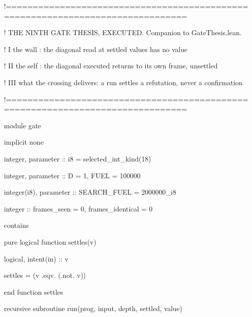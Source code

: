 \documentclass[10pt,twocolumn]{article}
\newenvironment{Shaded}{}{}
\newcommand{\CommentTok}[1]{#1}
\newcommand{\DataTypeTok}[1]{#1}
\newcommand{\DecValTok}[1]{#1}
\newcommand{\FunctionTok}[1]{#1}
\newcommand{\KeywordTok}[1]{#1}
\newcommand{\NormalTok}[1]{#1}
\newcommand{\OperatorTok}[1]{#1}
\providecommand{\CommentTok}[1]{#1}
\providecommand{\DataTypeTok}[1]{#1}
\providecommand{\DecValTok}[1]{#1}
\providecommand{\FunctionTok}[1]{#1}
\providecommand{\KeywordTok}[1]{#1}
\providecommand{\NormalTok}[1]{#1}
\providecommand{\OperatorTok}[1]{#1}
\providecommand{\CommentTok}[1]{#1}
\providecommand{\DataTypeTok}[1]{#1}
\providecommand{\DecValTok}[1]{#1}
\providecommand{\FunctionTok}[1]{#1}
\providecommand{\KeywordTok}[1]{#1}
\providecommand{\NormalTok}[1]{#1}
\providecommand{\OperatorTok}[1]{#1}
\begin{document}
\begin{strip}
\begin{Shaded}
\begin{Highlighting}[]
\CommentTok{!===============================================================================}

\CommentTok{!  THE NINTH GATE THESIS, EXECUTED. Companion to GateThesis.lean.}

\CommentTok{!  I   the wall   : the diagonal read at settled values has no value}

\CommentTok{!  II  the self   : the diagonal executed returns to its own frame, unsettled}

\CommentTok{!  III what the crossing delivers: a run settles a refutation, never a confirmation}

\CommentTok{!===============================================================================}

\KeywordTok{module}\NormalTok{ gate}

  \KeywordTok{implicit} \KeywordTok{none}

  \DataTypeTok{integer}\NormalTok{, }\DataTypeTok{parameter} \DataTypeTok{::}\NormalTok{ i8 }\KeywordTok{=} \FunctionTok{selected\_int\_kind}\NormalTok{(}\DecValTok{18}\NormalTok{)}

  \DataTypeTok{integer}\NormalTok{, }\DataTypeTok{parameter} \DataTypeTok{::}\NormalTok{ D }\KeywordTok{=} \DecValTok{1}\NormalTok{, FUEL }\KeywordTok{=} \DecValTok{100000}

  \DataTypeTok{integer(i8)}\NormalTok{, }\DataTypeTok{parameter} \DataTypeTok{::}\NormalTok{ SEARCH\_FUEL }\KeywordTok{=} \DecValTok{2000000\_i8}

  \DataTypeTok{integer} \DataTypeTok{::}\NormalTok{ frames\_seen }\KeywordTok{=} \DecValTok{0}\NormalTok{, frames\_identical }\KeywordTok{=} \DecValTok{0}

\CommentTok{contains}

  \KeywordTok{pure} \DataTypeTok{logical} \KeywordTok{function}\NormalTok{ settles(v)}

    \DataTypeTok{logical}\NormalTok{, }\DataTypeTok{intent(in)} \DataTypeTok{::}\NormalTok{ v}

\NormalTok{    settles }\KeywordTok{=}\NormalTok{ (v }\OperatorTok{.eqv.}\NormalTok{ (}\OperatorTok{.not.}\NormalTok{ v))}

  \KeywordTok{end function}\NormalTok{ settles}

  \KeywordTok{recursive} \KeywordTok{subroutine}\NormalTok{ run(prog, input, depth, settled, value)}


\end{Highlighting}
\end{Shaded}
\end{strip}
\end{document}
